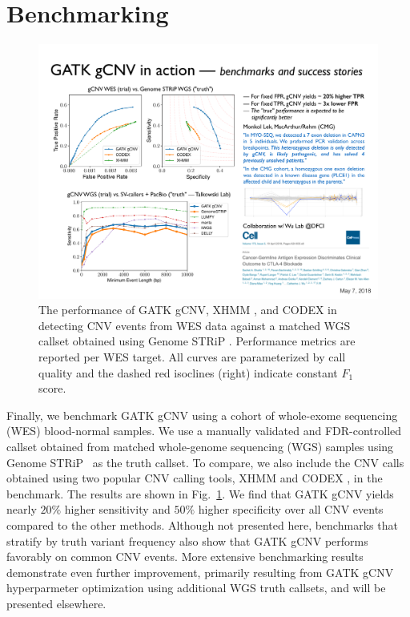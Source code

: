 \documentclass[sigplan]{acmart}\settopmatter{printfolios=true,printccs=false,printacmref=false}
\begin{document}
\section{Benchmarking}\label{sec:bench}
\begin{figure}
\includegraphics[width=\columnwidth]{figures/germline-cnv-caller-model/benchmark.pdf}
\caption{The performance of GATK gCNV, XHMM \cite{fromer_discovery_2012}, and CODEX \cite{jiang_codex:_2015} in detecting CNV events from WES data against a matched WGS callset obtained using Genome STRiP \cite{handsaker_large_2015}.  Performance metrics are reported per WES target.  All curves are parameterized by call quality and the dashed red isoclines (right) indicate constant $F_1$ score.}  
\label{fig:benchmark}
\end{figure}
Finally, we benchmark GATK gCNV using a cohort of whole-exome sequencing (WES) blood-normal samples. We use a manually validated and FDR-controlled callset obtained from matched whole-genome sequencing (WGS) samples using Genome STRiP~\cite{handsaker_large_2015} as the truth callset. To compare, we also include the CNV calls obtained using two popular CNV calling tools, XHMM \cite{fromer_discovery_2012} and CODEX \cite{jiang_codex:_2015}, in the benchmark. The results are shown in Fig.~\ref{sec:bench}. We find that GATK gCNV yields nearly $20\%$ higher sensitivity and $50\%$ higher specificity over all CNV events compared to the other methods.  Although not presented here, benchmarks that stratify by truth variant frequency also show that GATK gCNV performs favorably on common CNV events. More extensive benchmarking results demonstrate even further improvement, primarily resulting from GATK gCNV hyperparmeter optimization using additional WGS truth callsets, and will be presented elsewhere.


\end{document}
